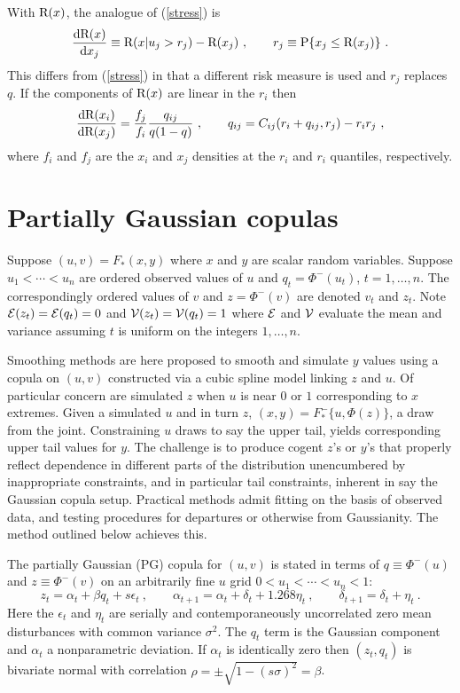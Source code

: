 \documentclass[authoryear]{elsarticle}
\newcommand{\p}{\mathrm{P}}
\newcommand{\eps}{\epsilon}
\newcommand{\Ex}{{\cal E}}
\newcommand{\de}{\mathrm{d}}
\newcommand{\eref}[1]{(\ref{#1})}
\newcommand{\cq}{\ , \qquad}
\newcommand{\Vx}{{\cal V}}
\newcommand{\be}[1]{\begin{equation}\label{#1}}
\newcommand{\ee}{\end{equation}}
\begin{document}
With $\mathrm{R}(x)$, the analogue of \eref{stress} is 
\be{stress2}
\frac{\de\r(x)}{\de x_j} \equiv \r(x|u_j>r_j) - \r(x_j)\cq r_j\equiv\p\{x_j\le\r(x_j)\} \ .
\ee
This differs from \eref{stress}  in that a different risk measure is used and  $r_j$ replaces $q$.   If  the components of $\mathrm{R}(x)$ are linear in the $r_i$ then
\be{implicit2}
\frac{\de\r(x_i)}{\de\r(x_j)} =  
\frac{f_j}{f_i} 
 \frac{q_{ij}}{q(1-q)}\cq q_{ij}=C_{ij}(r_i+q_{ij},r_j) - r_ir_j\ ,
\ee
where $f_i$ and $f_j$ are the $x_i$ and $x_j$ densities at the $r_i$ and $r_i$ quantiles, respectively. 

\section{Partially Gaussian copulas}

Suppose $(u,v)=F_*(x,y)$  where $x$ and $y$ are scalar random variables.    Suppose $u_1<\cdots<u_n$  are   ordered observed values of $u$ and $q_t=\Phi^-(u_t)$, $t=1,\ldots,n$.  The correspondingly ordered values of $v$ and $z=\Phi^-(v)$ are denoted $v_t$ and $z_t$.  Note $\Ex(z_t)=\Ex(q_t)=0$ and $\Vx(z_t)=\Vx(q_t)=1$ where $\Ex$ and $\Vx$ evaluate the mean and variance assuming $t$ is uniform on the integers $1,\ldots,n$. 

Smoothing methods are here proposed to smooth and simulate $y$ values  using a copula on $(u,v)$ constructed via    a cubic spline model linking $z$ and $u$.   Of particular concern are simulated $z$ when $u$ is  near $0$ or $1$ corresponding to  $x$ extremes.    Given a simulated $u$ and in turn $z$, $(x,y)=F^-_*\{u,\Phi(z)\}$, a draw from the joint.  Constraining $u$ draws to say the upper tail, yields corresponding upper tail values for $y$.   The challenge is to produce cogent $z$'s or $y$'s that properly reflect dependence in different parts of the distribution unencumbered by inappropriate constraints, and in particular tail constraints, inherent in say the Gaussian copula setup.    Practical methods admit fitting on the basis of observed data, and testing procedures for  departures or otherwise from Gaussianity.   The method outlined below achieves this.

The partially Gaussian  (PG) copula for $(u,v)$ is stated in terms of  $q\equiv\Phi^-(u)$ and $z\equiv\Phi^-(v)$ on an arbitrarily fine $u$ grid $0<u_1<\cdots<u_n<1$:  
\be{cusp}
z_t = \alpha_t+\beta q_t+ s\eps_t\cq \alpha_{t+1}=\alpha_t +\delta_t+1.268\eta_t\cq \delta_{t+1}=\delta_t+\eta_t\ .
\ee
Here the $\eps_t$ and $\eta_t$ are serially and contemporaneously uncorrelated zero mean disturbances with common variance $\sigma^2$.  The  $q_t$ term is the   Gaussian component and  $\alpha_t$ a nonparametric deviation.  If $\alpha_t$ is identically zero then  $(z_t,q_t)$  is bivariate normal  with correlation $\rho=\pm\sqrt{1-(s\sigma)^2}=\beta$.  
\end{document}
